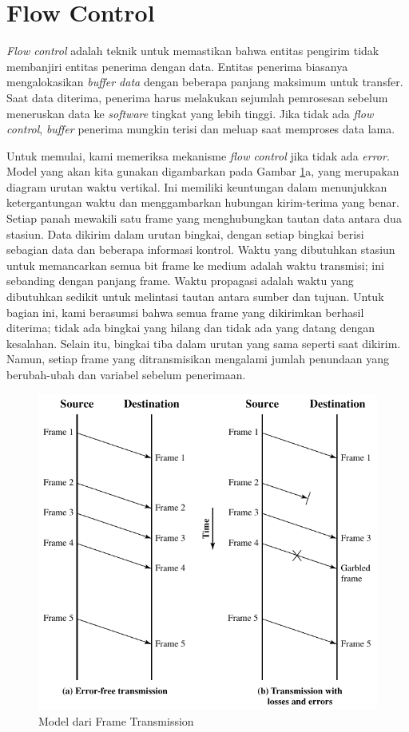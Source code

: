 \section{Flow Control}

\textit{Flow control} adalah teknik untuk memastikan bahwa entitas pengirim tidak membanjiri entitas penerima dengan data. Entitas penerima biasanya mengalokasikan \textit{buffer data} dengan beberapa panjang maksimum untuk transfer. Saat data diterima, penerima harus melakukan sejumlah pemrosesan sebelum meneruskan data ke \textit{software} tingkat yang lebih tinggi. Jika tidak ada \textit{flow control}, \textit{buffer} penerima mungkin terisi dan meluap saat memproses data lama.

Untuk memulai, kami memeriksa mekanisme \textit{flow control} jika tidak ada \textit{error}. Model yang akan kita gunakan digambarkan pada Gambar \ref{fig:07.01}a, yang merupakan diagram urutan waktu vertikal. Ini memiliki keuntungan dalam menunjukkan ketergantungan waktu dan menggambarkan hubungan kirim-terima yang benar. Setiap panah mewakili satu frame yang menghubungkan tautan data antara dua stasiun. Data dikirim dalam urutan bingkai, dengan setiap bingkai berisi sebagian data dan beberapa informasi kontrol. Waktu yang dibutuhkan stasiun untuk memancarkan semua bit frame ke medium adalah waktu transmisi; ini sebanding dengan panjang frame. Waktu propagasi adalah waktu yang dibutuhkan sedikit untuk melintasi tautan antara sumber dan tujuan. Untuk bagian ini, kami berasumsi bahwa semua frame yang dikirimkan berhasil diterima; tidak ada bingkai yang hilang dan tidak ada yang datang dengan kesalahan. Selain itu, bingkai tiba dalam urutan yang sama seperti saat dikirim. Namun, setiap frame yang ditransmisikan mengalami jumlah penundaan yang berubah-ubah dan variabel sebelum penerimaan.\footnotemark


\begin{figure}
	\centering
	\includegraphics[width=0.7\linewidth]{gambar/fig:07.01}
	\caption{Model dari Frame Transmission}
	\label{fig:07.01}
\end{figure}

